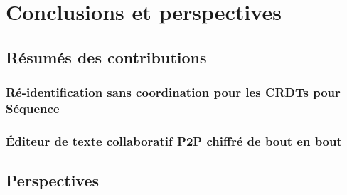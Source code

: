 \documentclass[12pt]{thesul}
\theoremstyle{definition}
\begin{document}
% 

% 

% 

% 



\NumberThisInToc
\chapter{Conclusions et perspectives}
\minitoc
\label{chap:conclusions-perspectives}




\section{Résumés des contributions}

\subsection{Ré-identification sans coordination pour les \acp{CRDT} pour Séquence}


\subsection{Éditeur de texte collaboratif \ac{P2P} chiffré de bout en bout}


\section{Perspectives}
\end{document}
